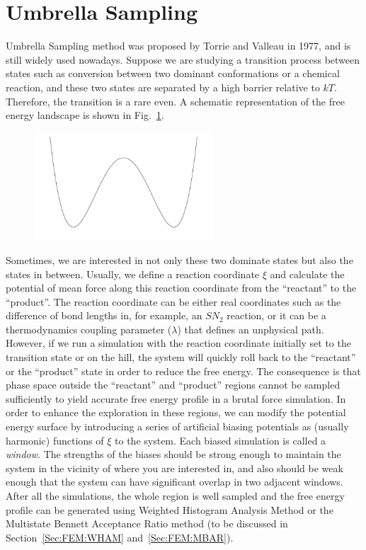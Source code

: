 \section{Umbrella Sampling\label{Sec:ES:US}}
Umbrella Sampling method was proposed by Torrie and Valleau in 1977,\cite{TorrieJComputP1977} and is still widely used nowadays.
Suppose we are studying a transition process between states such as conversion between two dominant conformations or a chemical reaction, and these two states are separated by a high barrier relative to $kT$. Therefore, the transition is a rare even. A schematic representation of the free energy landscape is shown in Fig.~\ref{Fig:ES:dual_harmonic}.
\begin{figure}[htbp]
	\centering
	\includegraphics[width=0.6\textwidth]{figures/dual_harmonic.pdf}\\
	\caption{}\label{Fig:ES:dual_harmonic}
\end{figure}

Sometimes, we are interested in not only these two dominate states but also the states in between. Usually, we define a reaction coordinate $\xi$ and calculate the potential of mean force along this reaction coordinate from the ``reactant'' to the ``product''. The reaction coordinate can be either real coordinates such as the difference of bond lengths in, for example, an $SN_2$ reaction, or it can be a thermodynamics coupling parameter ($\lambda$) that defines an unphysical path. However, if we run a simulation with the reaction coordinate initially set to the transition state or on the hill, the system will quickly roll back to the ``reactant'' or the ``product'' state in order to reduce the free energy. The consequence is that phase space outside the ``reactant'' and ``product'' regions cannot be sampled sufficiently to yield accurate free energy profile in a brutal force simulation. In order to enhance the exploration in these regions, we can modify the potential energy surface by introducing a series of artificial biasing potentials as (usually harmonic) functions of $\xi$ to the system. Each biased simulation is called a \textit{window}. The strengths of the biases should be strong enough to maintain the system in the vicinity of where you are interested in, and also should be weak enough that the system can have significant overlap in two adjacent windows. After all the simulations, the whole region is well sampled and the free energy profile can be generated using Weighted Histogram Analysis Method or the Multistate Bennett Acceptance Ratio method (to be discussed in Section~\ref{Sec:FEM:WHAM} and~\ref{Sec:FEM:MBAR}).